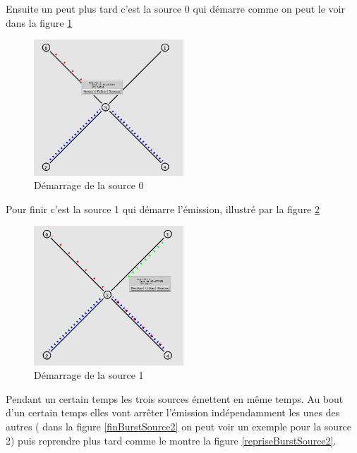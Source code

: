 \documentclass[11pt]{article}
\begin{document}
Ensuite un peut plus tard c'est la source 0 qui démarre comme on peut le voir dans la figure \ref{demarageSource0}

\begin{figure}[H]
	\begin{center}
		\includegraphics[width=0.5\textwidth]{assets/tp3/demarageSource0.png}
	\end{center}
	\caption{Démarrage de la source 0}
	\label{demarageSource0}
\end{figure}

Pour finir c'est la source 1 qui démarre l’émission, illustré par la figure \ref{demarageSource1}

\begin{figure}[H]
	\begin{center}
		\includegraphics[width=0.5\textwidth]{assets/tp3/demarageSource1.png}
	\end{center}
	\caption{Démarrage de la source 1}
	\label{demarageSource1}
\end{figure}

Pendant un certain temps les trois sources émettent en même temps. Au bout d'un certain temps elles vont arrêter l’émission indépendamment les unes des autres ( dans la figure \ref{finBurstSource2} on peut voir un exemple pour la source 2) puis reprendre plus tard comme le montre la figure \ref{repriseBurstSource2}.
\end{document}
